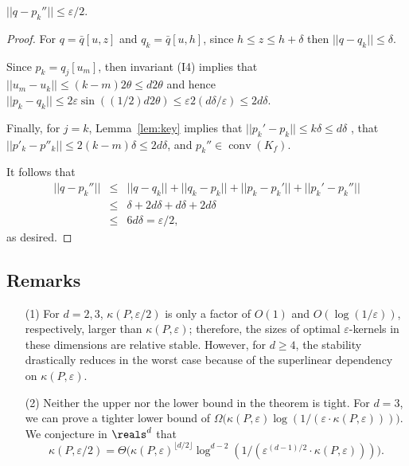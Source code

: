 \documentclass[11pt]{myclass}
\newcommand{\eps}{\varepsilon}
\newcommand{\conv}[1]{\mathop{\mathrm{conv}}(#1)}
\newcommand{\opt}[2]{\kappa(#1,#2)}
\newcommand{\fq}{\bar{q}}
\newcommand{\point}[3]{{#1}[#3,#2]}
\newcommand{\rotate}[2]{{#1}[#2]}
\begin{document}
\begin{lemma}
$|| q - p_k''|| \leq \eps/2$.  \end{lemma}

\begin{proof}
For $q = \point{\fq}{z}{u}$ and $q_k = \point{\fq}{h}{u}$, since $h\leq z \leq h+\delta$ then $||q - q_k|| \leq \delta$.    

Since $p_k = \rotate{q_j}{u_m}$, then invariant (I4) implies that $||u_m - u_k|| \leq (k-m)2\theta \leq d 2\theta$ and hence $||p_k - q_k|| \leq 2 \eps \sin((1/2) d 2\theta) \leq \eps 2(d \delta/\eps) \leq 2d \delta$.  

Finally, for $j=k$, Lemma~\ref{lem:key} implies that $||p_k' - p_k|| \leq k\delta\leq d\delta $ , that $||p'_k - p''_k|| \leq 2(k-m)\delta \leq 2d \delta$, and $p_k'' \in\conv{K_f}$. 

It follows that
\begin{eqnarray*}
|| q - p_k''|| & \leq & ||q - q_k|| +||q_k - p_k|| +||p_k - p_k'|| + ||p_k' - p_k''|| \\ 
                  & \leq & \delta + 2d\delta + d\delta + 2d\delta \\
                  & \leq & 6d\delta = \eps/2,
\end{eqnarray*}
as desired.
\end{proof}




\subsection{Remarks}
\begin{itemize} \denselist
\item[(1)] For $d=2, 3$,  $\opt{P}{\eps/2}$ is only a factor of $O(1)$ and $O(\log(1/\eps))$, respectively, larger than $\opt{P}{\eps}$; therefore, the sizes of optimal $\eps$-kernels in these dimensions are relative stable. However, for $d \geq 4$, the stability drastically reduces in the worst case because of the superlinear dependency on $\opt{P}{\eps}$.

\item[(2)] Neither the upper nor the lower bound in the theorem is tight. For $d=3$, we can prove a tighter lower bound of $\Omega\bigl(\opt{P}{\eps} \log (1/ (\eps \cdot \opt{P}{\eps}))\bigr)$. We conjecture in $\reals^d$ that 
$$
\opt{P}{\eps/2} = \Theta\bigl(\opt{P}{\eps}^{\lfloor d/2 \rfloor} \log^{d-2} (1/(\eps^{(d-1)/2} \cdot \opt{P}{\eps})) \bigr).
$$ 
\end{itemize}








\end{document}
